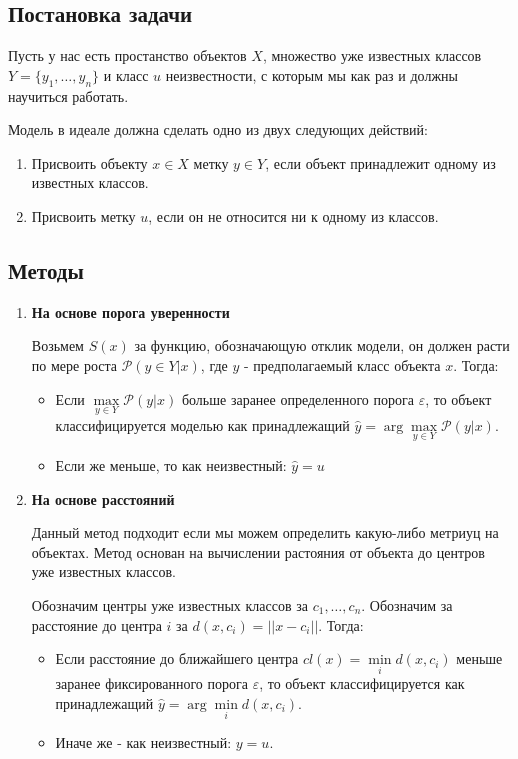 \subsection{Постановка задачи}
Пусть у нас есть простанство объектов $X$, множество уже известных классов $Y = \{y_1, \dots, y_n\}$ и класс $u$ неизвестности, с которым мы как раз и должны научиться работать.

Модель в идеале должна сделать одно из двух следующих действий:
\begin{enumerate}
    \item Присвоить объекту $x \in X$ метку $y \in Y$, если объект принадлежит одному из известных классов.
    \item Присвоить метку $u$, если он не относится ни к одному из классов.
\end{enumerate}

\subsection{Методы}
\begin{enumerate}
    \item \textbf{На основе порога уверенности}
    
    Возьмем $S(x)$ за функцию, обозначающую отклик модели, он должен расти по мере роста $\mathcal{P}(y \in Y | x)$, где $y$ - предполагаемый класс объекта $x$. 
    Тогда:
    \begin{itemize} 
        \item Если $\max\limits_{y \in Y}{\mathcal{P}(y|x)}$ больше заранее определенного порога $\varepsilon$, то объект классифицируется моделью как принадлежащий $\hat{y} = \arg\max\limits_{y \in Y}{\mathcal{P}(y|x)}$.
        \item Если же меньше, то как неизвестный: $\hat{y} = u$
    \end{itemize}

    \item \textbf{На основе расстояний}
    
    Данный метод подходит если мы можем определить какую-либо метриуц на объектах.
    Метод основан на вычислении растояния от объекта до центров уже известных классов.
    
    Обозначим центры уже известных классов за $c_1, \dots, c_n$. 
    Обозначим за расстояние до центра $i$ за $d(x, c_i) = || x - c_i ||$. 
    Тогда:
    \begin{itemize}
        \item Если расстояние до ближайшего центра $cl(x) = \min\limits_{i}d(x, c_i)$ меньше заранее фиксированного порога $\varepsilon$, то объект классифицируется как принадлежащий $\hat{y} = \arg\min\limits_{i}d(x, c_i)$.
        \item Иначе же - как неизвестный: $y = u$.
    \end{itemize}
\end{enumerate}


